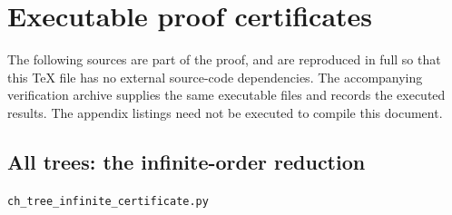 \documentclass[11pt,a4paper]{article}
\theoremstyle{remark}
\numberwithin{equation}{section}
\begin{document}
\clearpage
\appendix
\section{Executable proof certificates}
\label{app:certificates}

The following sources are part of the proof, and are reproduced in
full so that this TeX file has no external source-code dependencies.
The accompanying verification archive supplies the same executable
files and records the executed results. The appendix listings need
not be executed to compile this document.




\subsection{All trees: the infinite-order reduction}
\texttt{ch\_tree\_infinite\_certificate.py}
\end{document}
